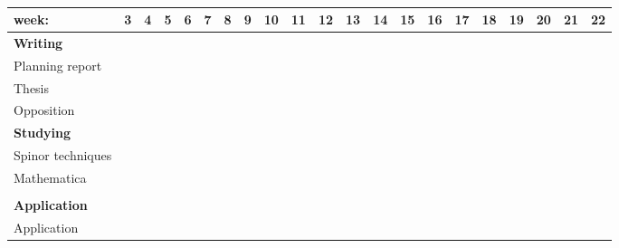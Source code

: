 \begin{table}[H]
\caption{}
\begin{footnotesize}
\begin{tabular}{|l|l|l|l|l|l|l|l|l|l|l|l|l|l|l|l|l|l|l|l|l|}
\hline
week: & \multicolumn{1}{r|}{3} & \multicolumn{1}{r|}{4} & \multicolumn{1}{r|}{5} & \multicolumn{1}{r|}{6} & \multicolumn{1}{r|}{7} & \multicolumn{1}{r|}{8} & \multicolumn{1}{r|}{9} & \multicolumn{1}{r|}{10} & \multicolumn{1}{r|}{11} & \multicolumn{1}{r|}{12} & \multicolumn{1}{r|}{13} & \multicolumn{1}{r|}{14} & \multicolumn{1}{r|}{15} & \multicolumn{1}{r|}{16} & \multicolumn{1}{r|}{17} & \multicolumn{1}{r|}{18} & \multicolumn{1}{r|}{19} & \multicolumn{1}{r|}{20} & \multicolumn{1}{r|}{21} & \multicolumn{1}{r|}{22} \\ \hline
\textbf{Writing} &  &  &  &  &  &  &  &  &  &  &  &  &  &  &  &  &  &  &  &  \\ \hline
Planning report & \cellcolor{orange!75} & \cellcolor{orange!75} & \cellcolor{orange!75} & \cellcolor{red!75} &  &  &  &  &  &  &  &  &  &  &  &  &  &  &  &  \\ \hline
Thesis & \cellcolor{orange!75} & \cellcolor{orange!75} & \cellcolor{orange!75} & \cellcolor{orange!75} & \cellcolor{orange!75} & \cellcolor{orange!75} & \cellcolor{orange!75} & \cellcolor{orange!75} & \cellcolor{orange!75} & \cellcolor{orange!75} & \cellcolor{orange!75} & \cellcolor{orange!75} & \cellcolor{orange!75} & \cellcolor{orange!75} & \cellcolor{orange!75} & \cellcolor{orange!75} & \cellcolor{orange!75} & \cellcolor{red!75} &  &  \\ \hline
Opposition &  &  &  &  &  &  &  &  &  &  &  &  &  &  &  &  &  & \cellcolor{orange!75} & \cellcolor{red!75} &  \\ \hline
\textbf{Studying} &  &  &  &  &  &  &  &  &  &  &  &  &  &  &  &  &  &  &  &  \\ \hline
Spinor techniques & \cellcolor{orange!75} & \cellcolor{orange!75} & \cellcolor{orange!75} & \cellcolor{orange!75} & \cellcolor{orange!75} &  &  &  &  &  &  &  &  &  &  &  &  &  &  &  \\ \hline
Mathematica &  &  &  &  & \cellcolor{orange!75} & \cellcolor{orange!75} & \cellcolor{orange!75} & \cellcolor{orange!75} & \cellcolor{orange!75} & \cellcolor{orange!75} &  &  &  &  &  &  &  &  &  &  \\ \hline
\cite{AndBaeBlu14a} &  &  &  &  & \cellcolor{orange!75} & \cellcolor{orange!75} & \cellcolor{orange!75} & \cellcolor{orange!75} & \cellcolor{orange!75} & \cellcolor{orange!75} &  &  &  &  &  &  &  &  &  &  \\ \hline
\textbf{Application} &  &  &  &  &  &  &  &  &  &  &  &  &  &  &  &  &  &  &  &  \\ \hline
Application &  &  &  &  &  &  &  &  &  & \cellcolor{orange!75} & \cellcolor{orange!75} & \cellcolor{orange!75} & \cellcolor{orange!75} & \cellcolor{orange!75} & \cellcolor{orange!75} &  &  &  &  &  \\ \hline
\end{tabular}
\end{footnotesize}
\label{tab:gantt_schedule}
\end{table}

